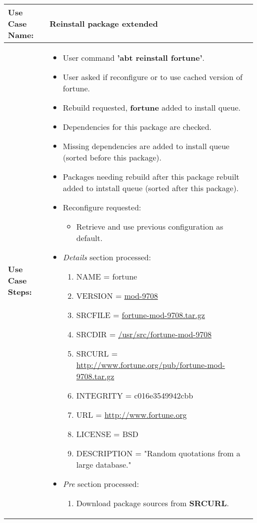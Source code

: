 \medskip

\begin{tabularx}{\linewidth}{|l|X|}
\hline
\textbf{Use Case Name:} & \textbf{Reinstall package extended} \\
\hline
\textbf{Use Case Steps:} & 
\begin{minipage}{\linewidth} 
  \vspace{0.05em}
  \begin{itemize}
    \item User command \textbf{'abt reinstall fortune'}.
    \item User asked if reconfigure or to use cached version of fortune.
    \item Rebuild requested, \textbf{fortune} added to install queue.
    \item Dependencies for this package are checked.
    \item Missing dependencies are added to install queue (sorted before this package).
    \item Packages needing rebuild after this package rebuilt added to intstall queue (sorted after this package).
    \item Reconfigure requested:
    \begin{itemize}
      \item Retrieve and use previous configuration as default.
    \end{itemize}
    \item \emph{Details} section processed:
    \begin{enumerate}
      \item NAME = fortune
      \item VERSION = \url{mod-9708}
      \item SRCFILE = \url{fortune-mod-9708.tar.gz}
      \item SRCDIR = \url{/usr/src/fortune-mod-9708}
      \item SRCURL = \url{http://www.fortune.org/pub/fortune-mod-9708.tar.gz}
      \item INTEGRITY = c016e3549942cbb
      \item URL = \url{http://www.fortune.org}
      \item LICENSE = BSD
      \item DESCRIPTION = "Random quotations from a large database."
    \end{enumerate}
    \item \emph{Pre} section processed:
    \begin{enumerate}
      \item Download package sources from \textbf{SRCURL}.

\end{enumerate}
\end{itemize}
\end{minipage}
\end{tabularx}
